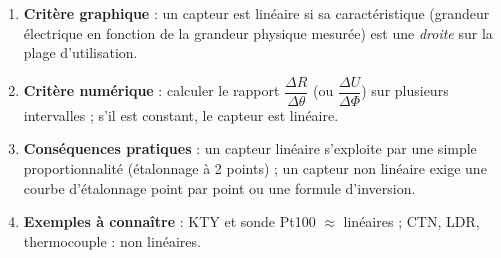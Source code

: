 \documentclass[11pt]{article}
\begin{document}
\begin{methode}
\begin{enumerate}
\item \textbf{Critère graphique} : un capteur est linéaire si sa caractéristique (grandeur électrique en fonction de la grandeur physique mesurée) est une \emph{droite} sur la plage d'utilisation.
\item \textbf{Critère numérique} : calculer le rapport $\dfrac{\Delta R}{\Delta \theta}$ (ou $\dfrac{\Delta U}{\Delta \Phi}$) sur plusieurs intervalles ; s'il est constant, le capteur est linéaire.
\item \textbf{Conséquences pratiques} : un capteur linéaire s'exploite par une simple proportionnalité (étalonnage à 2 points) ; un capteur non linéaire exige une courbe d'étalonnage point par point ou une formule d'inversion.
\item \textbf{Exemples à connaître} : KTY et sonde Pt100 $\approx$ linéaires ; CTN, LDR, thermocouple : non linéaires.
\end{enumerate}
\end{methode}
\end{document}

